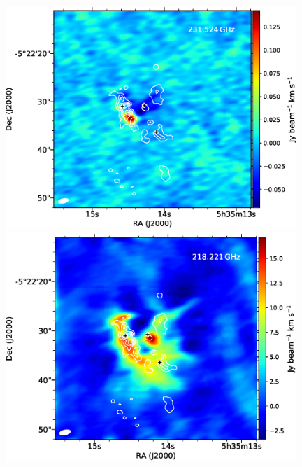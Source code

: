 \begin{figure}[H]
\begin{center}
\begin{minipage}{0.98\textwidth}
\begin{center}
\begin{minipage}{0.48\textwidth}
\begin{center}
\end{center}
\end{minipage}
\end{center}
\end{minipage}

\begin{minipage}{0.98\textwidth} 
\begin{center}
\begin{minipage}{0.48\textwidth}
\begin{center}
\includegraphics[width=0.98\textwidth]{OrionKL/mom0/231.524mom0_3-7.eps}
\end{center}
\end{minipage}
\begin{minipage}{0.48\textwidth}
\begin{center}
\includegraphics[width=0.98\textwidth]{OrionKL/mom0/218.221mom0_3-7.eps}

\end{center}
\end{minipage}
\end{center}
\end{minipage}
\end{center}
\end{figure}
